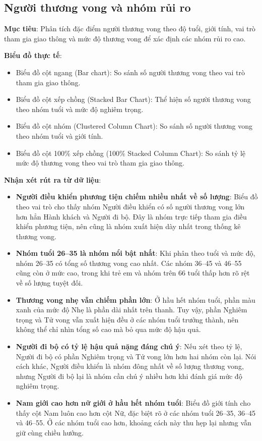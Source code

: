 \subsection{Người thương vong và nhóm rủi ro}

\textbf{Mục tiêu}: Phân tích đặc điểm người thương vong theo độ tuổi, giới tính, vai trò tham gia giao thông và mức độ thương vong để xác định các nhóm rủi ro cao.

\textbf{Biểu đồ thực tế}:
\begin{itemize}
    \item Biểu đồ cột ngang (Bar chart): So sánh số người thương vong theo vai trò tham gia giao thông.
    \item Biểu đồ cột xếp chồng (Stacked Bar Chart): Thể hiện số người thương vong theo nhóm tuổi và mức độ nghiêm trọng.
    \item Biểu đồ cột nhóm (Clustered Column Chart): So sánh số người thương vong theo nhóm tuổi và giới tính.
    \item Biểu đồ cột 100\% xếp chồng (100\% Stacked Column Chart): So sánh tỷ lệ mức độ thương vong theo vai trò tham gia giao thông.
\end{itemize}

\textbf{Nhận xét rút ra từ dữ liệu}:
\begin{itemize}
    \item \textbf{Người điều khiển phương tiện chiếm nhiều nhất về số lượng}: Biểu đồ theo vai trò cho thấy nhóm Người điều khiển có số người thương vong lớn hơn hẳn Hành khách và Người đi bộ. Đây là nhóm trực tiếp tham gia điều khiển phương tiện, nên cũng là nhóm xuất hiện dày nhất trong thống kê thương vong.
    \item \textbf{Nhóm tuổi 26--35 là nhóm nổi bật nhất}: Khi phân theo tuổi và mức độ, nhóm 26--35 có tổng số thương vong cao nhất. Các nhóm 36--45 và 46--55 cũng còn ở mức cao, trong khi trẻ em và nhóm trên 66 tuổi thấp hơn rõ rệt về số lượng tuyệt đối.
    \item \textbf{Thương vong nhẹ vẫn chiếm phần lớn}: Ở hầu hết nhóm tuổi, phần màu xanh của mức độ Nhẹ là phần dài nhất trên thanh. Tuy vậy, phần Nghiêm trọng và Tử vong vẫn xuất hiện đều ở các nhóm tuổi trưởng thành, nên không thể chỉ nhìn tổng số cao mà bỏ qua mức độ hậu quả.
    \item \textbf{Người đi bộ có tỷ lệ hậu quả nặng đáng chú ý}: Nếu xét theo tỷ lệ, Người đi bộ có phần Nghiêm trọng và Tử vong lớn hơn hai nhóm còn lại. Nói cách khác, Người điều khiển là nhóm đông nhất về số lượng thương vong, nhưng Người đi bộ lại là nhóm cần chú ý nhiều hơn khi đánh giá mức độ nghiêm trọng.
    \item \textbf{Nam giới cao hơn nữ giới ở hầu hết nhóm tuổi}: Biểu đồ giới tính cho thấy cột Nam luôn cao hơn cột Nữ, đặc biệt rõ ở các nhóm tuổi 26--35, 36--45 và 46--55. Ở các nhóm tuổi cao hơn, khoảng cách này thu hẹp lại nhưng vẫn giữ cùng chiều hướng.
\end{itemize}

